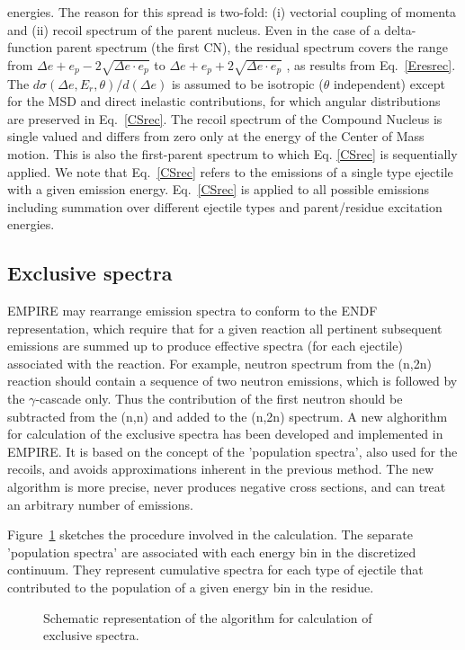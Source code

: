 \documentclass[twocolumn,amsmath,amssymb,10pt,groupedaddress,a4paper]{revtex4}
\begin{document}
energies. The reason for this spread is two-fold: (i) vectorial coupling
of momenta and (ii) recoil spectrum of the parent nucleus. Even in
the case of a delta-function parent spectrum (the first CN), the residual
spectrum covers the range from $\Delta e+e_{p}-2\sqrt{\Delta e\cdot e_{p}}$
to $\Delta e+e_{p}+2\sqrt{\Delta e\cdot e_{p}}$ , as results from
Eq.~\ref{Eresrec}. The $d\sigma(\Delta e,E_{r},\theta)/d(\Delta e)$
is assumed to be isotropic ($\theta$ independent) except for the
MSD and direct inelastic contributions, for which angular
distributions are preserved in Eq.~\ref{CSrec}. The recoil spectrum
of the Compound Nucleus is single valued and differs from zero only
at the energy of the Center of Mass motion. This is also the first-parent
spectrum to which Eq. \ref{CSrec} is sequentially applied. We note
that Eq.~\ref{CSrec} refers to the emissions of a single type ejectile
with a given emission energy. Eq.~\ref{CSrec} is  applied to all
possible emissions including summation over different ejectile types
and parent/residue excitation energies.

\subsection{Exclusive spectra}
EMPIRE may rearrange emission spectra to conform to the ENDF representation,
which require that for a given reaction all pertinent subsequent emissions
are summed up to produce effective spectra (for each ejectile) associated
with the reaction. For example, neutron spectrum from the (n,2n) reaction
should contain a sequence of two neutron emissions, which is followed
by the $\gamma$-cascade only. Thus the contribution of the first
neutron should be subtracted from the (n,n) and added to the (n,2n)
spectrum.
A new alghorithm for calculation of the exclusive spectra has been
developed and implemented in EMPIRE. It is based on the concept
of the 'population spectra', also used for the recoils, and avoids
approximations inherent in the previous method. The new algorithm
is more precise, never produces negative cross sections, and can treat
an arbitrary number of emissions.

Figure~\ref{exclusive} sketches the procedure involved in the calculation.
The separate 'population spectra' are associated with each energy bin in the
discretized continuum. They represent cumulative spectra for each type of ejectile
that contributed to the population of a given energy bin in the residue.
\begin{figure}[htbp]
\caption{\label{exclusive} Schematic representation  of the algorithm for calculation
of exclusive spectra.}
\end{figure}
\end{document}

